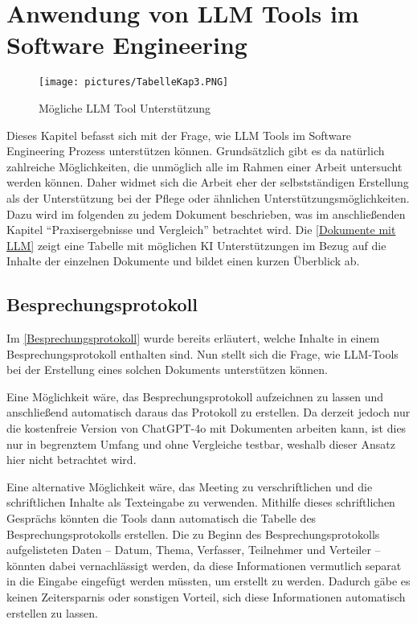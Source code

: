 \chapter{Anwendung von LLM Tools im Software Engineering} 

\begin{figure}
    \centering
    \texttt{[image: pictures/TabelleKap3.PNG]}
    \caption{Mögliche LLM Tool Unterstützung}
    \label{Dokumente mit LLM}
\end{figure}

Dieses Kapitel befasst sich mit der Frage, wie LLM Tools im Software Engineering Prozess unterstützen können.
Grundsätzlich gibt es da natürlich zahlreiche Möglichkeiten, die unmöglich alle im Rahmen einer Arbeit untersucht 
werden können. Daher widmet sich die Arbeit eher der selbstständigen Erstellung als der Unterstützung bei 
der Pflege oder ähnlichen Unterstützungsmöglichkeiten. Dazu wird im folgenden zu jedem Dokument beschrieben,
was im anschließenden Kapitel ``Praxisergebnisse und Vergleich'' betrachtet wird. Die \autoref{Dokumente mit LLM}
zeigt eine Tabelle mit möglichen KI Unterstützungen im Bezug auf die Inhalte der einzelnen Dokumente und bildet 
einen kurzen Überblick ab.

\section{Besprechungsprotokoll}  \label{LLMBesprechungsprotokoll}

Im \autoref{Besprechungsprotokoll} wurde bereits erläutert, welche Inhalte in einem Besprechungsprotokoll enthalten 
sind. Nun stellt sich die Frage, wie LLM-Tools bei der Erstellung eines solchen Dokuments unterstützen können.

Eine Möglichkeit wäre, das Besprechungsprotokoll aufzeichnen zu lassen und anschließend automatisch daraus das 
Protokoll zu erstellen. Da derzeit jedoch nur die kostenfreie Version von ChatGPT-4o mit Dokumenten arbeiten kann, 
ist dies nur in begrenztem Umfang und ohne Vergleiche testbar, weshalb dieser Ansatz hier nicht betrachtet wird.

Eine alternative Möglichkeit wäre, das Meeting zu verschriftlichen und die schriftlichen Inhalte als Texteingabe zu 
verwenden. Mithilfe dieses schriftlichen Gesprächs könnten die Tools dann automatisch die Tabelle des 
Besprechungsprotokolls erstellen. Die zu Beginn des Besprechungsprotokolls aufgelisteten Daten – Datum, Thema, 
Verfasser, Teilnehmer und Verteiler – könnten dabei vernachlässigt werden, da diese Informationen vermutlich separat 
in die Eingabe eingefügt werden müssten, um erstellt zu werden. Dadurch gäbe es keinen Zeitersparnis oder sonstigen 
Vorteil, sich diese Informationen automatisch erstellen zu lassen.


